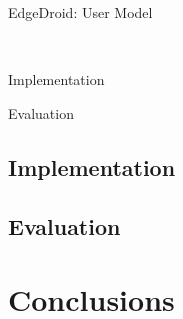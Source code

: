 \documentclass[aspectratio=1610]{beamer}
\begin{document}
\begin{frame}{EdgeDroid: User Model}
    \begin{center}
        \\
    \end{center}
\end{frame}

\begin{frame}{Implementation}
    \begin{center}
        
    \end{center}
\end{frame}

\begin{frame}{Evaluation}

\end{frame}


\subsection{Implementation}
\subsection{Evaluation}
\section{Conclusions}
\end{document}
